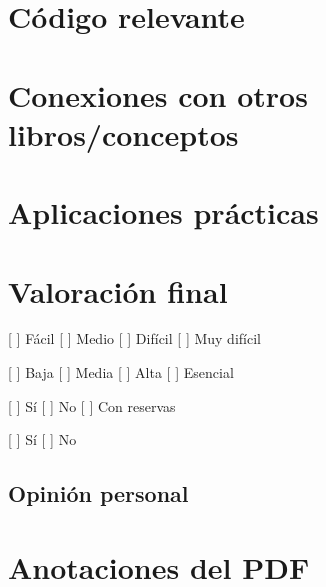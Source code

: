 \section{Código relevante}\label{cuxf3digo-relevante}

\begin{Shaded}
\begin{Highlighting}[]
\end{Highlighting}
\end{Shaded}

\section{Conexiones con otros libros/conceptos}\label{conexiones-con-otros-librosconceptos}

\section{Aplicaciones prácticas}\label{aplicaciones-pruxe1cticas}

\section{Valoración final}\label{valoraciuxf3n-final}

\begin{description}
\tightlist
\item[Dificultad]
{[} {]} Fácil {[} {]} Medio {[} {]} Difícil {[} {]} Muy difícil
\item[Utilidad]
{[} {]} Baja {[} {]} Media {[} {]} Alta {[} {]} Esencial
\item[Recomendaría]
{[} {]} Sí {[} {]} No {[} {]} Con reservas
\item[Releer]
{[} {]} Sí {[} {]} No
\end{description}

\subsection{Opinión personal}\label{opiniuxf3n-personal}

\section{Anotaciones del PDF}\label{anotaciones-del-pdf}
